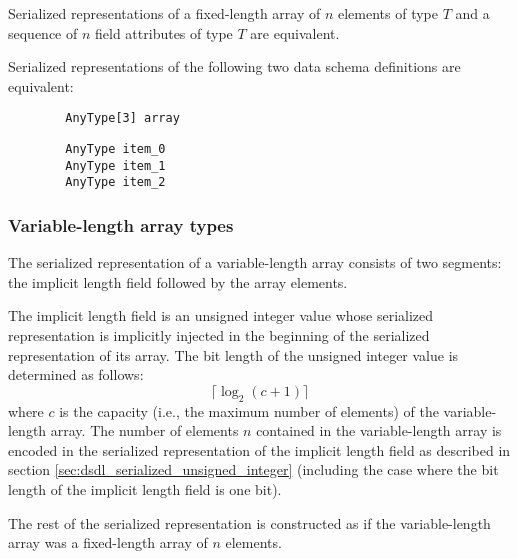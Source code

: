 Serialized representations of a fixed-length array of $n$ elements of type $T$ and
a sequence of $n$ field attributes of type $T$ are equivalent.

\begin{remark}
    Serialized representations of the following two data schema definitions are equivalent:

    \begin{verbatim}
        AnyType[3] array
    \end{verbatim}

    \begin{verbatim}
        AnyType item_0
        AnyType item_1
        AnyType item_2
    \end{verbatim}
\end{remark}

\subsubsection{Variable-length array types}

The serialized representation of a variable-length array consists of two segments:
the implicit length field followed by the array elements.

The implicit length field is an unsigned integer value whose serialized representation
is implicitly injected in the beginning of the serialized representation of its array.
The bit length of the unsigned integer value is determined as follows:
$$\lceil{}\log_2 (c + 1)\rceil{}$$
where $c$ is the capacity (i.e., the maximum number of elements) of the variable-length array.
The number of elements $n$ contained in the variable-length array is encoded in the serialized representation
of the implicit length field as described in section \ref{sec:dsdl_serialized_unsigned_integer}
(including the case where the bit length of the implicit length field is one bit).

The rest of the serialized representation is constructed as if the variable-length array was
a fixed-length array of $n$ elements.

